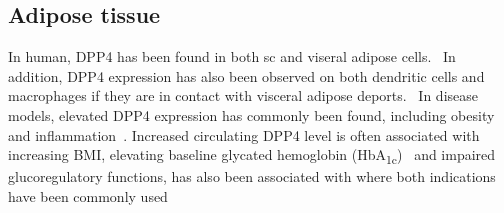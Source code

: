 \subsection{Adipose tissue}
In human, DPP4 has been found in both sc and viseral adipose cells.~\cite{Lamers2011} In addition, DPP4 expression has also been observed on both dendritic cells and macrophages if they are in contact with visceral adipose deports.~\cite{Zhong2013} In disease models, elevated DPP4 expression has commonly been found, including obesity and inflammation~\cite{Zhong2013}. Increased circulating DPP4 level is often associated with increasing BMI, elevating baseline glycated hemoglobin (HbA\textsubscript{1c})~\cite{2011}  and impaired glucoregulatory functions,  has also been associated with where both indications have been commonly used 